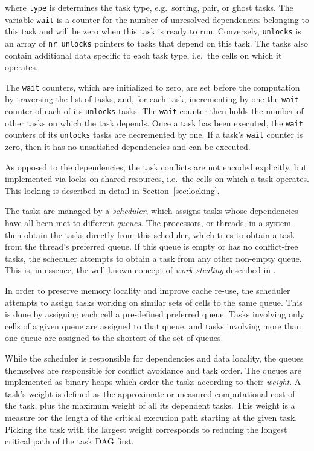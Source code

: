\documentclass[final]{siamltex}
\newcommand{\sect}[1]
    {Section~\ref{sec:#1}}
\begin{document}
\noindent where {\tt type} is determines the task type, e.g.~sorting,
pair, or ghost tasks.
The variable {\tt wait} is a counter for the number of
unresolved dependencies belonging to this task and will be
zero when this task is ready to run.
Conversely, {\tt unlocks} is an array of {\tt nr\_unlocks}
pointers to tasks that depend on this task.
The tasks also contain additional data specific to each task
type, i.e.~the cells on which it operates.

The {\tt wait} counters, which are initialized to zero, are
set before the computation by traversing the list of tasks, and,
for each task, incrementing by one the {\tt wait} counter of each of its
{\tt unlocks} tasks.
The {\tt wait} counter then holds the number of other tasks on which
the task depends.
Once a task has been executed, the {\tt wait} counters of its
{\tt unlocks} tasks are decremented by one.
If a task's {\tt wait} counter is zero, then it has no
unsatisfied dependencies and can be executed.

As opposed to the dependencies, the task conflicts are not
encoded explicitly, but implemented via locks on shared resources,
i.e.~the cells on which a task operates.
This locking is described in detail in \sect{locking}.

The tasks are managed by a {\em scheduler}, which assigns tasks
whose dependencies have all been met to different {\em queues}.
The processors, or threads, in a system then obtain the tasks
directly from this scheduler, which tries to obtain a task
from the thread's preferred queue.
If this queue is empty or has no conflict-free tasks, the scheduler
attempts to obtain a task from any other non-empty queue.
This is, in essence, the well-known concept of {\em work-stealing}
described in \cite{ref:Blumofe1999}.

In order to preserve memory locality and improve cache re-use,
the scheduler attempts to assign tasks working on similar sets
of cells to the same queue.
This is done by assigning each cell a pre-defined preferred queue.
Tasks involving only cells of a given queue are assigned to that
queue, and tasks involving more than one queue are assigned to
the shortest of the set of queues.

While the scheduler is responsible for dependencies and data
locality, the queues themselves are responsible for conflict
avoidance and task order.
The queues are implemented as binary heaps which order the tasks
according to their {\em weight}.
A task's weight is defined as the approximate or
measured computational cost of the task, plus the maximum
weight of all its dependent tasks.
This weight is a measure for the length of the critical
execution path starting at the given task.
Picking the task with the largest weight corresponds to reducing
the longest critical path of the task DAG first.
\end{document}
